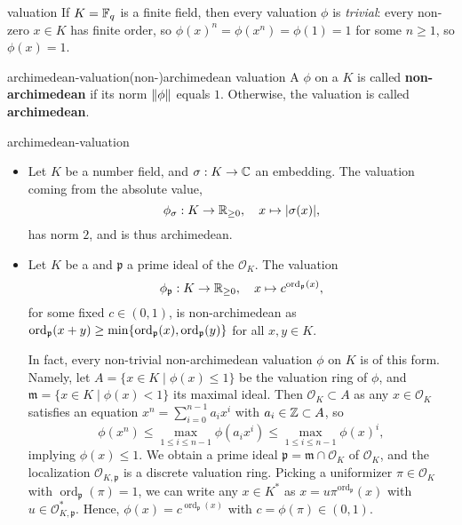 \begin{example}{valuation}
    If $K = \mathbb{F}_q$ is a finite field, then every valuation $\phi$ is \textit{trivial}: every non-zero $x \in K$ has finite order, so $\phi(x)^n = \phi(x^n) = \phi(1) = 1$ for some $n \ge 1$, so $\phi(x) = 1$.
\end{example}

\begin{topic}{archimedean-valuation}{(non-)archimedean valuation}
    A  $\phi$ on a  $K$ is called \textbf{non-archimedean} if its norm $\left\|\phi\right\|$ equals $1$. Otherwise, the valuation is called \textbf{archimedean}.
\end{topic}

\begin{example}{archimedean-valuation}
    \begin{itemize}
        \item Let $K$ be a number field, and $\sigma : K \to \mathbb{C}$ an embedding. The valuation coming from the absolute value,
        \[ \phi_\sigma : K \to \mathbb{R}_{\ge 0}, \quad x \mapsto |\sigma(x)| , \]
        has norm $2$, and is thus archimedean.
        \item Let $K$ be a  and $\mathfrak{p}$ a prime ideal of the  $\mathcal{O}_K$. The valuation
        \[ \phi_\mathfrak{p} : K \to \mathbb{R}_{\ge 0}, \quad x \mapsto c^{\textup{ord}_\mathfrak{p}(x)} , \]
        for some fixed $c \in (0, 1)$, is non-archimedean as $\textup{ord}_\mathfrak{p}(x + y) \ge \min \{ \textup{ord}_\mathfrak{p}(x), \textup{ord}_\mathfrak{p}(y) \}$ for all $x, y \in K$.
        
        In fact, every non-trivial non-archimedean valuation $\phi$ on $K$ is of this form. Namely, let $A = \{ x \in K \mid \phi(x) \le 1 \}$ be the valuation ring of $\phi$, and $\mathfrak{m} = \{ x \in K \mid \phi(x) < 1 \}$ its maximal ideal. Then $\mathcal{O}_K \subset A$ as any $x \in \mathcal{O}_K$ satisfies an equation $x^n = \sum_{i = 0}^{n - 1} a_i x^i$ with $a_i \in \mathbb{Z} \subset A$, so
        \[ \phi(x^n) \le \max_{1 \le i \le n - 1} \phi(a_i x^i) \le \max_{1 \le i \le n - 1} \phi(x)^i , \]
        implying $\phi(x) \le 1$. We obtain a prime ideal $\mathfrak{p} = \mathfrak{m} \cap \mathcal{O}_K$ of $\mathcal{O}_K$, and the localization $\mathcal{O}_{K, \mathfrak{p}}$ is a discrete valuation ring. Picking a uniformizer $\pi \in \mathcal{O}_K$ with $\operatorname{ord}_\mathfrak{p}(\pi) = 1$, we can write any $x \in K^*$ as $x = u \pi^{\operatorname{ord}_\mathfrak{p}}(x)$ with $u \in \mathcal{O}_{K, \mathfrak{p}}^*$. Hence, $\phi(x) = c^{\operatorname{ord}_\mathfrak{p}(x)}$ with $c = \phi(\pi) \in (0, 1)$.
    \end{itemize}
\end{example}

